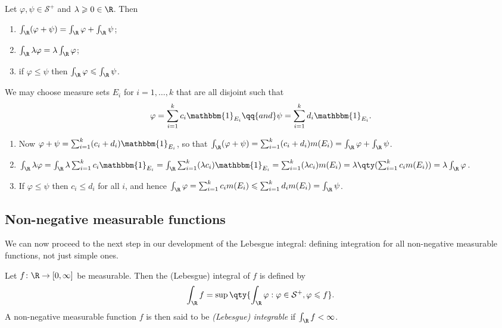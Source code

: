 \documentclass{maths}
\newcommand{\smpl}{\mathcal{S}}
\newcommand{\ind}{\mathbbm{1}}
\begin{document}
\begin{prop}
    Let $\varphi,\psi\in\smpl^+$ and $\lambda\geqslant0\in\R$.
    Then
    \begin{enumerate}
        \item $\int_{\R}(\varphi+\psi) = \int_{\R}\varphi + \int_{\R}\psi$;
        \item $\int_{\R}\lambda\varphi = \lambda\int_{\R}\varphi$;
        \item if $\varphi\leqslant\psi$ then $\int_{\R}\varphi\leqslant\int_{\R}\psi$.
    \end{enumerate}
\end{prop}

\begin{prf}
    We may choose measure sets $E_i$ for $i=1,\ldots,k$ that are all disjoint such that
        \[
            \varphi =
            \sum_{i=1}^k c_i \ind_{E_i}
            \qq{and}
            \psi =
            \sum_{i=1}^k d_i \ind_{E_i}.
        \]
    \begin{enumerate}
        \item Now $\varphi+\psi=\sum_{i=1}^k (c_i + d_i)\ind_{E_i}$, so that $\int_{\R}(\varphi+\psi)=\sum_{i=1}^k (c_i + d_i)m(E_i)=\int_{\R}\varphi + \int_{\R}\psi$.
        \item $\int_{\R}\lambda\varphi=\int_{\R}\lambda\sum_{i=1}^k c_i \ind_{E_i}=\int_{\R}\sum_{i=1}^k (\lambda c_i) \ind_{E_i}=\sum_{i=1}^k (\lambda c_i) m(E_i)=\lambda\qty(\sum_{i=1}^k c_i m(E_i))=\lambda\int_{\R}\varphi$.
        \item If $\varphi\leqslant\psi$ then $c_i\leqslant d_i$ for all $i$, and hence $\int_{\R}\varphi=\sum_{i=1}^k c_i m(E_i)\leqslant\sum_{i=1}^k d_i m(E_i)=\int_{\R}\psi$.
    \end{enumerate}
\end{prf}

\subsection{Non-negative measurable functions}

We can now proceed to the next step in our development of the Lebesgue integral: defining integration for all non-negative measurable functions, not just simple ones.

\begin{defn}
    Let $f\colon\R\to[0,\infty]$ be measurable.
    Then the (Lebesgue) integral of $f$ is defined by
    \[
        \int_{\R} f =
        \sup\qty{\int_{\R} \varphi : \varphi\in\smpl^+,\varphi\leqslant f}.
    \]
    A non-negative measurable function $f$ is then said to be \emph{(Lebesgue) integrable} if $\int_{\R}f<\infty$.
\end{defn}
\end{document}
